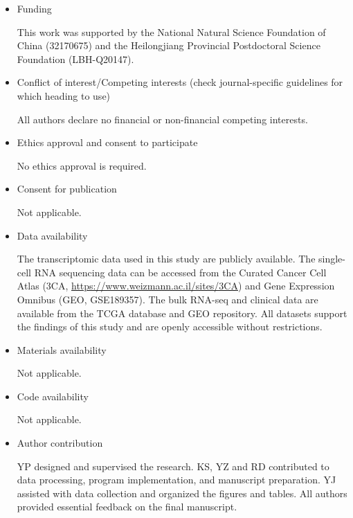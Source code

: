 \documentclass[pdflatex,sn-mathphys-num]{sn-jnl}%
\theoremstyle{thmstyleone}%
\theoremstyle{thmstyletwo}%
\theoremstyle{thmstylethree}%
\begin{document}
\begin{itemize}
\item Funding

This work was supported by the National Natural Science Foundation of China (32170675) and the Heilongjiang Provincial Postdoctoral Science Foundation (LBH-Q20147).
\item Conflict of interest/Competing interests (check journal-specific guidelines for which heading to use)

All authors declare no financial or non-financial competing interests. 
\item Ethics approval and consent to participate

No ethics approval is required.
\item Consent for publication

Not applicable.
\item Data availability 

The transcriptomic data used in this study are publicly available. The single-cell RNA sequencing data can be accessed from the Curated Cancer Cell Atlas (3CA, \url{https://www.weizmann.ac.il/sites/3CA}) and Gene Expression Omnibus (GEO, GSE189357).  The bulk RNA-seq and clinical data are available from the TCGA database and GEO repository. All datasets support the findings of this study and are openly accessible without restrictions.
\item Materials availability

Not applicable.
\item Code availability 

Not applicable.

\item Author contribution

YP designed and supervised the research. KS, YZ and RD contributed to data processing, program implementation, and manuscript preparation. YJ assisted with data collection and organized the figures and tables. All authors provided essential feedback on the final manuscript.
\end{itemize}


\end{document}
